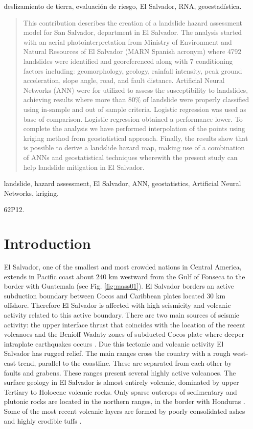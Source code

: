 \documentclass[11pt,twoside]{rmta2010eng}%
\begin{document}
\PC deslizamiento de tierra, evaluaci\'{o}n de riesgo, El Salvador, RNA, geoestad\'{i}stica.

\begin{abstract}
This contribution describes the creation of a landslide hazard
assessment model for San Salvador, department in El Salvador. The analysis started with an aerial photointerpretation from Ministry of Environment and Natural Resources of El Salvador (MARN Spanish acronym) where 4792 landslides were identified and georeferenced 
along with 7 conditioning factors including: geomorphology, geology, rainfall intensity, peak ground acceleration, slope angle, road, and fault distance. Artificial Neural Networks (ANN) were for utilized to assess the susceptibility to
landslides, achieving results where more than 80\% of landslide were properly classified using
in-sample and out of sample criteria. Logistic regression was used as base of
comparison. Logistic regression obtained a performance lower. To complete the analysis we have
performed interpolation of the points using kriging method from geostatistical
approach. Finally, the results show that is possible to derive a landslide hazard map, making use of a combination of ANNs and geostatistical techniques
wherewith the present study can help landslide mitigation in El Salvador.
\end{abstract}

\KW landslide, hazard assessment, El Salvador, ANN, geostatistics, Artificial Neural Networks, kriging.

\AMS 62P12.%



\section{Introduction}
\label{sec:intr}
El Salvador, one of the smallest and most crowded nations in Central America, extends in Pacific coast about 240 km westward from the Gulf of Fonseca to the border with Guatemala (see Fig. \ref{fig:mass01}). El Salvador borders an active subduction boundary between Cocos and Caribbean plates located 30 km offshore. Therefore El Salvador is affected with high seismicity and volcanic activity related to this active boundary. There are two main sources of seismic activity: the upper interface thrust that coincides with the location of the recent volcanoes and the Benioff-Wadaty zones of subducted Cocos plate where deeper intraplate earthquakes occurs \cite{dewey}. Due this tectonic and volcanic activity El Salvador has rugged relief. The main ranges cross the country with a rough west-east trend, parallel to the coastline. These are separated from each other by faults and grabens. These ranges present several highly active volcanoes. The surface geology in El Salvador is almost entirely volcanic, dominated by upper Tertiary to Holocene volcanic rocks. Only sparse outcrops of sedimentary and plutonic rocks are located in the northern ranges, in the border with Honduras \cite{weber}. Some of the most recent volcanic layers are formed by poorly consolidated ashes and highly erodible tuffs \cite{bommer}.
\end{document}
